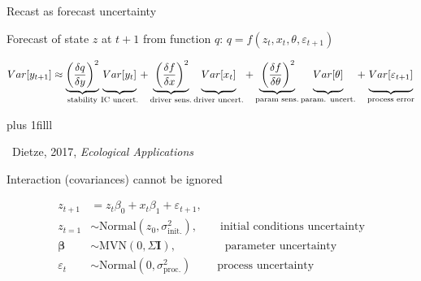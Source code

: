 \documentclass[14pt, compress, aspectratio=1610]{beamer}
\newcommand{\btVFill}{\vskip0pt plus 1filll}
\newcommand{\credit}[1]{\btVFill\par\hfill \footnotesize ~#1}
\begin{document}
\begin{frame}{%
\protect\hypertarget{recast-as-forecast-uncertainty}{%
Recast as forecast uncertainty}}

Forecast of state \(z\) at \(t+1\) from function \(q\):
\(q = f(z_t, x_t, \theta, \varepsilon_{t+1})\)

\small

\begin{align*}
Var[y_{t+1}] \approx \underbrace{\left(\frac{\delta q}{\delta y} \right)^2}_{\text{stability}} 
               \underbrace{\vphantom{ \left(\frac{\delta q}{\delta y} \right)^2 } Var[y_t]}_{\text{IC uncert.}} +
               \underbrace{\vphantom{ \left(\frac{\delta q}{\delta y} \right)^2 }\left(\frac{\delta f}{\delta x} \right)^2}_{\text{driver sens.}} 
               \underbrace{\vphantom{ \left(\frac{\delta q}{\delta y} \right)^2 } Var[x_t]}_{\text{driver uncert.}} +
               \underbrace{\vphantom{ \left(\frac{\delta q}{\delta y} \right)^2 }\left(\frac{\delta f}{\delta \theta} \right)^2}_{\text{param sens.}}
               \underbrace{\vphantom{ \left(\frac{\delta q}{\delta y} \right)^2 } Var[\theta]}_{\text{param. uncert.}} +
               \underbrace{\vphantom{ \left(\frac{\delta q}{\delta y} \right)^2 } Var[\varepsilon_{t+1}]}_{\text{process error}}
\end{align*}

\credit{Dietze, 2017, \emph{Ecological Applications}}

\end{frame}

\begin{frame}{%
\protect\hypertarget{interaction-covariances-cannot-be-ignored}{%
Interaction (covariances) cannot be ignored}}

\begin{align*}
z_{t+1} &= z_{t} \beta_0 + x_t \beta_1 + \varepsilon_{t+1}, \\
z_{t=1} &\sim \text{Normal}(z_0, \sigma^2_{\text{init.}}), \qquad \scriptstyle\text{initial conditions uncertainty} \\
\mathbf{\beta} &\sim \text{MVN}(0, \Sigma \textbf{I}), \qquad \qquad \; \scriptstyle\text{parameter uncertainty} \\
\varepsilon_t &\sim \text{Normal}(0, \sigma^2_{\text{proc.}}) \qquad \; \scriptstyle\text{process uncertainty}
\end{align*}

\end{frame}
\end{document}
